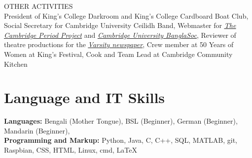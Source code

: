 \documentclass{article}
\begin{document}
\uppercase{Other Activities}\\
President of King's College Darkroom and King's College Cardboard Boat Club, Social Secretary for Cambridge University Ceilidh Band, Webmaster for \href{http://tcpp.soc.srcf.net/}{\underline{\textit{The Cambridge Period Project}}} and \href{https://cambridgebanglasoc.org/}{\underline{\textit{Cambridge University BanglaSoc}}}, Reviewer of theatre productions for the \href{https://www.varsity.co.uk/profile/sheamol-obeda}{\underline{\textit{Varsity newspaper}}}, Crew member at 50 Years of Women at King's Festival, Cook and Team Lead at Cambridge Community Kitchen

\medskip

\vspace{-.75\baselineskip}
\hrulefill
\vspace{-.75\baselineskip}

\section*{Language and IT Skills}
\textbf{Languages:} Bengali (Mother Tongue), 
BSL (Beginner), German (Beginner), Mandarin (Beginner),  \\
\textbf{Programming and Markup:} Python, Java, C, C++, SQL, MATLAB, git, Raspbian, CSS, HTML, Linux, cmd, \LaTeX\medskip

\vspace{-.75\baselineskip}
\hrulefill
\vspace{-.75\baselineskip}
\end{document}
